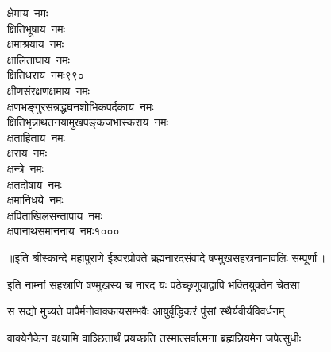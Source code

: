 \begin{multicols}{\maxColumns}
\begin{flushleft}
क्षेमाय~नमः\\
क्षितिभूषाय~नमः\\
क्षमाश्रयाय~नमः\\
क्षालिताघाय~नमः\\
क्षितिधराय~नमः\hfill ९९०\\
क्षीणसंरक्षणक्षमाय~नमः\\
क्षणभङ्गुरसन्नद्धघनशोभिकपर्दकाय~नमः\\
क्षितिभृन्नाथतनयामुखपङ्कजभास्कराय~नमः\\
क्षताहिताय~नमः\\
क्षराय~नमः\\
क्षन्त्रे~नमः\\
क्षतदोषाय~नमः\\
क्षमानिधये~नमः\\
क्षपिताखिलसन्तापाय~नमः\\
क्षपानाथसमाननाय~नमः\hfill १०००
\end{flushleft}
\end{multicols}
॥इति श्रीस्कान्दे महापुराणे ईश्वरप्रोक्ते ब्रह्मनारदसंवादे षण्मुखसहस्रनामावलिः सम्पूर्णा॥

\twolineshloka
{इति नाम्नां सहस्राणि षण्मुखस्य च नारद}
{यः पठेच्छृणुयाद्वापि भक्तियुक्तेन चेतसा}

\twolineshloka
{स सद्यो मुच्यते पापैर्मनोवाक्कायसम्भवैः}
{आयुर्वृद्धिकरं पुंसां स्थैर्यवीर्यविवर्धनम्}

\twolineshloka
{वाक्येनैकेन वक्ष्यामि वाञ्छितार्थं प्रयच्छति}
{तस्मात्सर्वात्मना ब्रह्मन्नियमेन जपेत्सुधीः}


